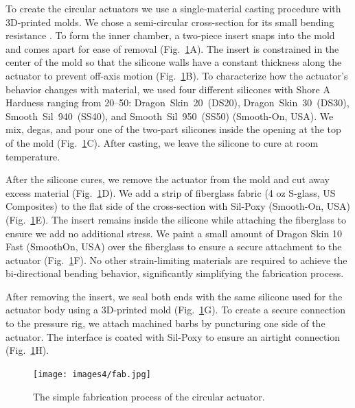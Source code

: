 To create the circular actuators we use a single-material casting procedure with 3D-printed molds. We chose a semi-circular cross-section for its small bending resistance \cite{polygerinos_modeling_2015}. To form the inner chamber, a two-piece insert snaps into the mold and comes apart for ease of removal (Fig.~\ref{figure:fab}A). The insert is constrained in the center of the mold so that the silicone walls have a constant thickness along the actuator to prevent off-axis motion (Fig.~\ref{figure:fab}B). To characterize how the actuator's behavior changes with material, we used four different silicones with Shore A Hardness ranging from 20--50: Dragon~Skin~20~(DS20), Dragon~Skin~30~(DS30), Smooth~Sil~940~(SS40), and Smooth~Sil~950~(SS50) (Smooth-On, USA). We mix, degas, and pour one of the two-part silicones inside the opening at the top of the mold (Fig.~\ref{figure:fab}C). After casting, we leave the silicone to cure at room temperature. 

After the silicone cures, we remove the actuator from the mold and cut away excess material (Fig.~\ref{figure:fab}D). We add a strip of fiberglass fabric (4 oz S-glass, US Composites) to the flat side of the cross-section with Sil-Poxy (Smooth-On, USA) (Fig.~\ref{figure:fab}E). The insert remains inside the silicone while attaching the fiberglass to ensure we add no additional stress. We paint a small amount of Dragon Skin 10 Fast (SmoothOn, USA) over the fiberglass to ensure a secure attachment to the actuator (Fig.~\ref{figure:fab}F). No other strain-limiting materials are required to achieve the bi-directional bending behavior, significantly simplifying the fabrication process. 

After removing the insert, we seal both ends with the same silicone used for the actuator body using a 3D-printed mold (Fig.~\ref{figure:fab}G). To create a secure connection to the pressure rig, we attach machined barbs by puncturing one side of the actuator. The interface is coated with Sil-Poxy to ensure an airtight connection (Fig.~\ref{figure:fab}H).

\begin{figure}[h!]
    \centering
     \texttt{[image: images4/fab.jpg]}
    \caption{The simple fabrication process of the circular actuator.}
    \label{figure:fab}
\end{figure}